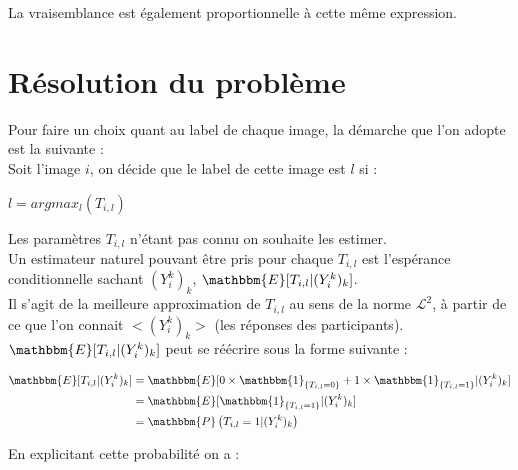 \documentclass[frenchb]{report}
\newcommand{\1}{\mathbbm{1}}
\newcommand{\E}{\mathbbm{E}}
\newcommand{\prob}{\mathbbm{P}}
\theoremstyle{definition}\newtheorem{defn}{Définition}
\theoremstyle{definition}\newtheorem{exm}{Exemple}
\theoremstyle{definition}\newtheorem{nota}{Notation}
\theoremstyle{definition}\newtheorem{rem}{Remarque}
\begin{document}
La vraisemblance est également proportionnelle à cette même expression.


\section{Résolution du problème}

Pour faire un choix quant au label de chaque image, la démarche que l'on adopte est la suivante :\\

Soit l'image $i$, on décide que le label de cette image est $l$ si : \\
\begin{center}
	$l = argmax_l (T_{i,l})$
\end{center}

Les paramètres $T_{i,l}$ n'étant pas connu on souhaite les estimer.\\
Un estimateur naturel pouvant être pris pour chaque $T_{i,l}$ est l'espérance conditionnelle sachant $(Y^k_i)_k$, $\E[T_{i,l}|(Y^k_i)_k]$. \\
Il s'agit de la meilleure approximation de $T_{i,l}$ au sens de la norme $\mathcal{L}^2$, à partir de ce que l'on connait $<(Y^k_i)_k>$ (les réponses des participants).\\

$\E[T_{i,l}|(Y^k_i)_k]$ peut se réécrire sous la forme suivante : 

\begin{center}
	\begin{align*}
		\E[T_{i,l}|(Y^k_i)_k] &= \E[0 \times \1_{\{T_{i,l} = 0\}} + 1 \times \1_{\{T_{i,l} = 1\}}|(Y^k_i)_k] \\
		&= \E[\1_{\{T_{i,l} = 1\}}|(Y^k_i)_k]\\
		&= \prob\left( T_{i,l} = 1 |(Y^k_i)_k \right)\\
	\end{align*}
\end{center}

En explicitant cette probabilité on a : 
\end{document}
